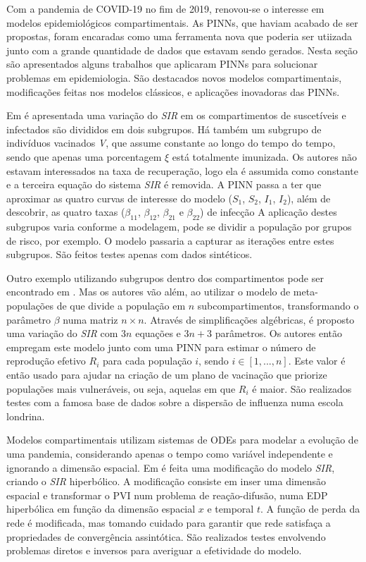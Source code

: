 Com a pandemia de COVID-19 no fim de 2019, renovou-se o interesse em modelos
epidemiológicos compartimentais. As PINNs, que haviam acabado de ser propostas,
foram encaradas como uma ferramenta nova que poderia ser utiizada junto com 
a grande quantidade de dados que estavam sendo gerados. 
Nesta seção são apresentados alguns trabalhos que aplicaram PINNs para solucionar
problemas em epidemiologia. São destacados novos modelos compartimentais, 
modificações feitas nos modelos clássicos, e aplicações inovadoras das PINNs.  

Em \cite{ouyoussef-etal:24-subcompartimentos} é apresentada uma variação
do \textit{SIR} em os compartimentos de suscetíveis e infectados 
são divididos em dois subgrupos. Há também um subgrupo de indivíduos 
vacinados \textit{V}, que assume constante ao longo do tempo do tempo, 
sendo que apenas uma porcentagem $\xi$ está totalmente imunizada.
Os autores não estavam interessados na taxa de recuperação, logo ela é assumida
como constante e a terceira equação do sistema \textit{SIR} é removida. 
A PINN passa a ter que aproximar as quatro curvas de interesse do modelo 
($S_1$, $S_2$, $I_1$, $I_2$), 
além de descobrir, as quatro taxas 
($\beta_{11}$, $\beta_{12}$, $\beta_{21}$ e $\beta_{22}$) de infecção
A aplicação destes subgrupos varia conforme a modelagem, 
pode se dividir a população por grupos de risco, por exemplo.
O modelo passaria a capturar as iterações entre estes subgrupos.
São feitos testes apenas com dados sintéticos. 

Outro exemplo utilizando subgrupos dentro dos compartimentos pode ser encontrado
em \cite{arulandu-etal:23-vacinacao}. Mas os autores vão além, ao utilizar 
o modelo de meta-populações de \cite{jacquez:1988-modelagam-hiv-matriz} que 
divide a população em $n$ subcompartimentos, transformando o parâmetro $\beta$ 
numa matriz $n \times n$. Através de simplificações algébricas, é proposto uma 
variação do \textit{SIR} com $3n$ equações e $3n + 3$ parâmetros.
Os autores então empregam este modelo junto com uma PINN para estimar o número 
de reprodução efetivo $R_i$ para cada população $i$, sendo $i \in [1,...,n]$. 
Este valor é então usado para ajudar na criação de um plano de vacinação que 
priorize populações mais vulneráveis, ou seja, aquelas em que $R_i$ é maior.
São realizados testes com a famosa base de dados sobre a dispersão de influenza
numa escola londrina.  

Modelos compartimentais utilizam sistemas de ODEs para modelar a evolução
de uma pandemia, considerando apenas o tempo como variável independente e 
ignorando a dimensão espacial.
Em \cite{bertaglia-etal:22-sir-reacao-difusao} é feita uma modificação do 
modelo \textit{SIR}, criando o \textit{SIR} hiperbólico. 
A modificação consiste em inser uma dimensão espacial e transformar o PVI
num problema de reação-difusão, numa EDP hiperbólica em função da dimensão espacial $x$
e temporal $t$. A função de perda da rede é modificada, mas tomando cuidado
para garantir que rede satisfaça a propriedades de convergência assintótica.
São realizados testes envolvendo problemas diretos e inversos para averiguar
a efetividade do modelo.

